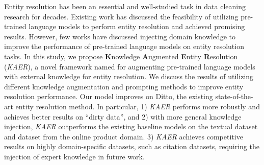 
Entity resolution has been an essential and well-studied task in data cleaning research for decades. 
Existing work has discussed the feasibility of utilizing pre-trained language models to perform entity resolution and achieved promising results.
However, few works have discussed injecting domain knowledge to improve the performance of pre-trained language models on entity resolution tasks. 
In this study, we propose \textbf{K}nowledge \textbf{A}ugmented \textbf{E}ntity \textbf{R}esolution (\textit{KAER}), a novel framework named for augmenting pre-trained language models with external knowledge for entity resolution. We discuss the results of utilizing different knowledge augmentation and prompting methods to improve entity resolution performance. %
Our model improves on Ditto, the existing state-of-the-art entity resolution method. In particular, 1) \textit{KAER} performs more robustly and achieves better results on ``dirty data'', and 2) with more general knowledge injection, \textit{KAER} outperforms the existing baseline models on the textual dataset and dataset from the online product domain. 3) \textit{KAER} achieves competitive results on highly domain-specific datasets, such as citation datasets, requiring the injection of expert knowledge in future work. 
